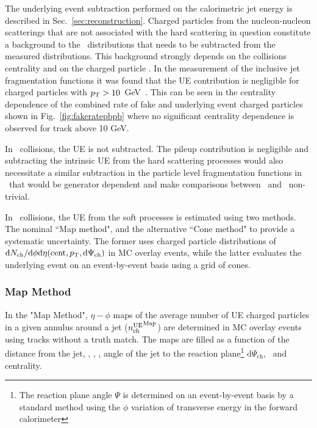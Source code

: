 The underlying event subtraction performed on the calorimetric jet energy is described in Sec.~\ref{sec:reconstruction}.
Charged particles from the nucleon-nucleon scatterings that are not associated with the hard scattering in question constitute a background to the \Dptr\ distributions that needs to be subtracted from the measured distributions.
This background strongly depends on the collisions centrality and on the charged particle \pt.
In the measurement of the inclusive jet fragmentation functions it was found that the UE contribution is negligible for charged particles with $\mbox{$p_{\mathrm{T}}$}>10$~GeV~\cite{PhysRevC.98.024908}.
This can be seen in the centrality dependence of the combined rate of fake and underlying event charged particles shown in Fig.~\ref{fig:fakeratepbpb} where no significant centrality dependence is observed for track above 10 GeV.


In \pp\ collisions, the UE is not subtracted.
The pileup contribution is negligible and subtracting the intrinsic UE from the hard scattering processes would also necessitate a similar subtraction in the particle level fragmentation functions in \pbpb\ that would be generator dependent and make comparisons between \pp\ and \pbpb\ non-trivial.

In \pbpb\ collisions, the UE from the soft processes is estimated using two methods.
The nominal ``Map method", and the alternative ``Cone method" to provide a systematic uncertainty.
The former uses charged particle distributions of $\mathrm{d}N_{\mathrm{ch}}/\mathrm{d}\phi\mathrm{d}\eta(\mathrm{cent},\mbox{$p_{\mathrm{T}}$}, \mathrm{d}\Psi_{\mathrm{ch}})$ in MC overlay events, while the latter evaluates the underlying event on an event-by-event basis using a grid of cones.


\subsubsection{Map Method}
\label{sec:map_method}


In the "Map Method", $\eta-\phi$ maps of the average number of UE charged particles in a given annulus around a jet ($\mbox{$n_{\mathrm{ch}}^{\mathrm{UE}}$}^{\mathrm{Map}}$) are determined in MC overlay events using tracks without a truth match.
The maps are filled as a function of the distance from the jet, \ptjet, \etajet, \phijet, angle of the jet to the reaction plane\footnote{The reaction plane angle $\Psi$ is determined on an event-by-event basis by a standard method using the $\phi$ variation of transverse energy in the forward calorimeter} $ \mathrm{d}\Psi_{\mathrm{ch}}$, \pt\ and centrality.

